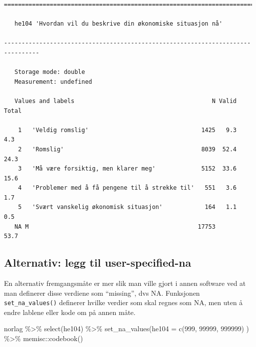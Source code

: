 \documentclass[
  letterpaper,
  DIV=11,
  numbers=noendperiod]{scrreprt}
\newenvironment{Shaded}{\begin{snugshade}}{\end{snugshade}}
\newcommand{\AttributeTok}[1]{\textcolor[rgb]{0.40,0.45,0.13}{#1}}
\newcommand{\DecValTok}[1]{\textcolor[rgb]{0.68,0.00,0.00}{#1}}
\newcommand{\FunctionTok}[1]{\textcolor[rgb]{0.28,0.35,0.67}{#1}}
\newcommand{\NormalTok}[1]{\textcolor[rgb]{0.00,0.23,0.31}{#1}}
\newcommand{\SpecialCharTok}[1]{\textcolor[rgb]{0.37,0.37,0.37}{#1}}
\begin{document}
\begin{verbatim}
================================================================================

   he104 'Hvordan vil du beskrive din økonomiske situasjon nå'

--------------------------------------------------------------------------------

   Storage mode: double
   Measurement: undefined

   Values and labels                                       N Valid Total
                                                                        
    1   'Veldig romslig'                                1425   9.3   4.3
    2   'Romslig'                                       8039  52.4  24.3
    3   'Må være forsiktig, men klarer meg'             5152  33.6  15.6
    4   'Problemer med å få pengene til å strekke til'   551   3.6   1.7
    5   'Svært vanskelig økonomisk situasjon'            164   1.1   0.5
   NA M                                                17753        53.7
\end{verbatim}

\hypertarget{alternativ-legg-til-user-specified-na}{%
\subsection{Alternativ: legg til
user-specified-na}\label{alternativ-legg-til-user-specified-na}}

En alternativ fremgangsmåte er mer slik man ville gjort i annen software
ved at man definerer disse verdiene som ``missing'', dvs NA. Funksjonen
\texttt{set\_na\_values()} definerer hvilke verdier som skal regnes som
NA, men uten å endre lablene eller kode om på annen måte.

\begin{Shaded}
\begin{Highlighting}[]
\NormalTok{norlag }\SpecialCharTok{\%\textgreater{}\%} 
  \FunctionTok{select}\NormalTok{(he104) }\SpecialCharTok{\%\textgreater{}\%} 
  \FunctionTok{set\_na\_values}\NormalTok{(}\AttributeTok{he104 =} \FunctionTok{c}\NormalTok{(}\DecValTok{999}\NormalTok{, }\DecValTok{99999}\NormalTok{, }\DecValTok{999999}\NormalTok{) ) }\SpecialCharTok{\%\textgreater{}\%} 
\NormalTok{  memisc}\SpecialCharTok{::}\FunctionTok{codebook}\NormalTok{()}
\end{Highlighting}
\end{Shaded}
\end{document}
